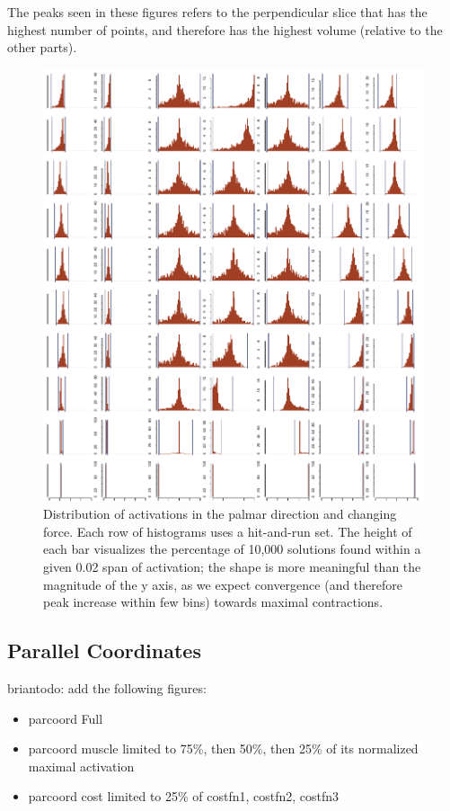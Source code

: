 The peaks seen in these figures refers to the perpendicular slice that has the highest number of points, and therefore has the highest volume (relative to the other parts).
\begin{figure}[htbp]
\centering
\includegraphics[width=\textwidth]{figs/Z_alphaProgression1430924065026.pdf}
\caption{Distribution of activations in the palmar direction and changing force. Each row of histograms uses a hit-and-run set. The height of each bar visualizes the percentage of 10,000 solutions found within a given 0.02 span of activation; the shape is more meaningful than the magnitude of the y axis, as we expect convergence (and therefore peak increase within few bins) towards maximal contractions.}
\label{fig:XY_progression}
\end{figure}

\subsection{Parallel Coordinates} %
\label{sub:parallel_coordinates}
briantodo: add the following figures:
\begin{itemize}
	\item{parcoord Full}
	\item{parcoord muscle limited to 75\%, then 50\%, then 25\% of its normalized maximal activation}
	\item{parcoord cost limited to 25\% of costfn1, costfn2, costfn3}
\end{itemize}


